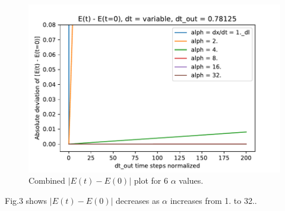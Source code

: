 \documentclass{article}
\begin{document}
\begin{figure}[H]
    \centering
    \includegraphics[scale=0.7]{E_dev_alph_all}
    \caption{Combined $|E(t) - E(0)|$ plot for 6 $\alpha$ values.}
    \label{fig:Q5}
\end{figure}

Fig.3 shows $|E(t) - E(0)|$ decreases as $\alpha$ increases from 1. to 32..
\end{document}
